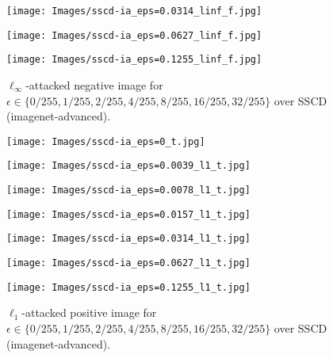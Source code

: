 \documentclass[12pt]{article}
\begin{document}
\begin{figure}[ht]
  \hfill
  \begin{minipage}{0.125\textwidth}
    \texttt{[image: Images/sscd-ia\_eps=0.0314\_linf\_f.jpg]}
  \end{minipage}
  \hfill
  \begin{minipage}{0.125\textwidth}
    \texttt{[image: Images/sscd-ia\_eps=0.0627\_linf\_f.jpg]}
  \end{minipage}
  \hfill
  \begin{minipage}{0.125\textwidth}
    \texttt{[image: Images/sscd-ia\_eps=0.1255\_linf\_f.jpg]}
  \end{minipage}
  \label{fig:sscd_linf_negative_examples}
  \caption{$\ell_\infty$-attacked negative image for $\epsilon \in \{0/255, 1/255, 2/255, 4/255, 8/255, 16/255, 32/255\}$ over SSCD (imagenet-advanced).}
  \vspace{10pt}
  \begin{minipage}{0.125\textwidth}
    \texttt{[image: Images/sscd-ia\_eps=0\_t.jpg]}
  \end{minipage}
  \hfill
  \begin{minipage}{0.125\textwidth}
    \texttt{[image: Images/sscd-ia\_eps=0.0039\_l1\_t.jpg]}
  \end{minipage}
  \hfill
  \begin{minipage}{0.125\textwidth}
    \texttt{[image: Images/sscd-ia\_eps=0.0078\_l1\_t.jpg]}
  \end{minipage}
  \hfill
  \begin{minipage}{0.125\textwidth}
    \texttt{[image: Images/sscd-ia\_eps=0.0157\_l1\_t.jpg]}
  \end{minipage}
  \hfill
  \begin{minipage}{0.125\textwidth}
    \texttt{[image: Images/sscd-ia\_eps=0.0314\_l1\_t.jpg]}
  \end{minipage}
  \hfill
  \begin{minipage}{0.125\textwidth}
    \texttt{[image: Images/sscd-ia\_eps=0.0627\_l1\_t.jpg]}
  \end{minipage}
  \hfill
  \begin{minipage}{0.125\textwidth}
    \texttt{[image: Images/sscd-ia\_eps=0.1255\_l1\_t.jpg]}
  \end{minipage}
  \label{fig:sscd_l1_positive_examples}
  \caption{$\ell_1$-attacked positive image for $\epsilon \in \{0/255, 1/255, 2/255, 4/255, 8/255, 16/255, 32/255\}$ over SSCD (imagenet-advanced).}
  \vspace{10pt}

\end{figure}
\end{document}
